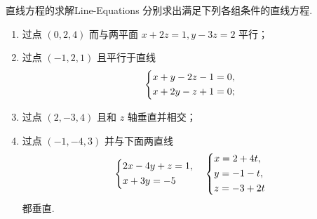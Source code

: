 \begin{problem}{直线方程的求解}{Line-Equations}
    分别求出满足下列各组条件的直线方程.
    \begin{enumerate}
        \item 过点 $(0, 2, 4)$ 而与两平面 $x + 2z = 1, y - 3z = 2$ 平行；
        \item 过点 $(-1, 2, 1)$ 且平行于直线
              \begin{equation}
                  \begin{dcases}
                      x + y - 2z - 1 = 0, \\
                      x + 2y - z + 1 = 0;
                  \end{dcases}
              \end{equation}
        \item 过点 $(2, -3, 4)$ 且和 $z$ 轴垂直并相交；
        \item 过点 $(-1, -4, 3)$ 并与下面两直线
              \begin{equation}
                  \begin{dcases}
                      2x - 4y + z = 1, \\
                      x + 3y = -5
                  \end{dcases} \quad
                  \begin{dcases}
                      x = 2 + 4t, \\
                      y = -1 - t, \\
                      z = -3 + 2t
                  \end{dcases}
              \end{equation}
              都垂直.
    \end{enumerate}
\end{problem}


